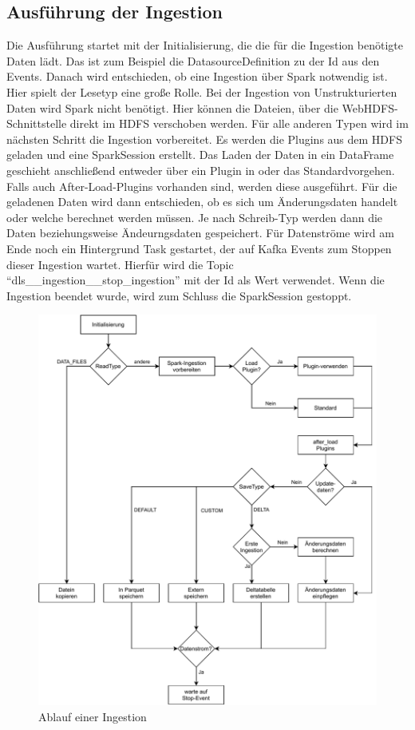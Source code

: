 \subsection{Ausführung der Ingestion}
\label{sec:ingestion-run}
Die Ausführung startet mit der Initialisierung, die die für die Ingestion benötigte Daten lädt.
Das ist zum Beispiel die DatasourceDefinition zu der Id aus den Events.
Danach wird entschieden, ob eine Ingestion über Spark notwendig ist.
Hier spielt der Lesetyp eine große Rolle.
Bei der Ingestion von Unstrukturierten Daten wird Spark nicht benötigt.
Hier können die Dateien, über die WebHDFS-Schnittstelle direkt im HDFS verschoben werden.
Für alle anderen Typen wird im nächsten Schritt die Ingestion vorbereitet.
Es werden die Plugins aus dem HDFS geladen und eine SparkSession erstellt.
Das Laden der Daten in ein DataFrame geschieht anschließend entweder über ein Plugin in oder das Standardvorgehen.
Falls auch After-Load-Plugins vorhanden sind, werden diese ausgeführt.
Für die geladenen Daten wird dann entschieden, ob es sich um Änderungsdaten handelt oder welche berechnet werden müssen.
Je nach Schreib-Typ werden dann die Daten beziehungsweise Ändeurngsdaten gespeichert.
Für Datenströme wird am Ende noch ein Hintergrund Task gestartet, der auf Kafka Events zum Stoppen dieser Ingestion wartet.
Hierfür wird die Topic "`dls\_\_ingestion\_\_stop\_ingestion"' mit der Id als Wert verwendet.
Wenn die Ingestion beendet wurde, wird zum Schluss die SparkSession gestoppt.

\begin{figure}
    \centering
    \includegraphics[width=\textwidth]{Grafiken/Umsetzung-Ingestion-Ablauf.pdf}
    \caption{Ablauf einer Ingestion}
    \label{fig:umsetz-ingestion-ablauf}
\end{figure}